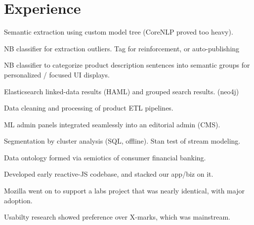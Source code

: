 \documentclass[letterpaper]{deedy-resume} %
\begin{document}
\begin{minipage}[t]{0.66\textwidth} %


\section{Experience}


\vspace{\topsep} %
\begin{tightitemize}
\item Semantic extraction using custom model tree (CoreNLP proved too heavy).
\item NB classifier for extraction outliers. Tag for reinforcement, or auto-publishing
\item NB classifier to categorize product description sentences into semantic groups for personalized / focused UI displays. 
\item Elasticsearch linked-data results (HAML) and grouped search results. (neo4j)
\item Data cleaning and processing of product ETL pipelines.
\item ML admin panels integrated seamlessly into an editorial admin (CMS).
\item Segmentation by cluster analysis (SQL, offline).  Stan test of stream modeling.
\item Data ontology formed via semiotics of consumer financial banking.

\end{tightitemize}

\sectionspace %


\vspace{\topsep} %
\begin{tightitemize}
\item Developed early reactive-JS codebase, and stacked our app/biz on it. 
\item Mozilla went on to support a labs project that was nearly identical, with major adoption. 
\item Usabilty research showed preference over X-marks, which was mainstream.
\end{tightitemize}


\end{minipage}
\end{document}
